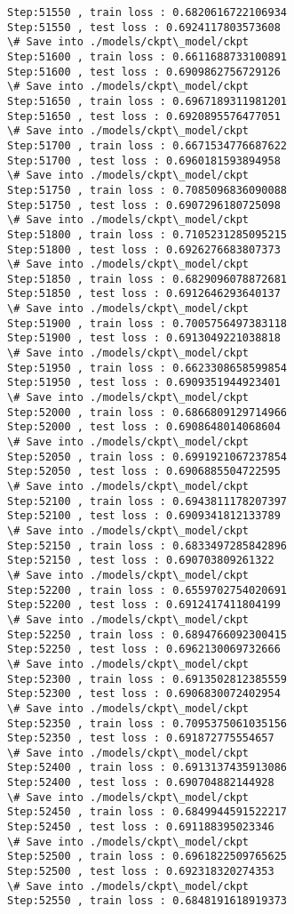 \documentclass[11pt]{article}
\begin{document}
\begin{Verbatim}[commandchars=\\\{\}]
Step:51550 , train loss : 0.6820616722106934
Step:51550 , test loss : 0.6924117803573608
\# Save into ./models/ckpt\_model/ckpt
Step:51600 , train loss : 0.6611688733100891
Step:51600 , test loss : 0.6909862756729126
\# Save into ./models/ckpt\_model/ckpt
Step:51650 , train loss : 0.6967189311981201
Step:51650 , test loss : 0.6920895576477051
\# Save into ./models/ckpt\_model/ckpt
Step:51700 , train loss : 0.6671534776687622
Step:51700 , test loss : 0.6960181593894958
\# Save into ./models/ckpt\_model/ckpt
Step:51750 , train loss : 0.7085096836090088
Step:51750 , test loss : 0.6907296180725098
\# Save into ./models/ckpt\_model/ckpt
Step:51800 , train loss : 0.7105231285095215
Step:51800 , test loss : 0.6926276683807373
\# Save into ./models/ckpt\_model/ckpt
Step:51850 , train loss : 0.6829096078872681
Step:51850 , test loss : 0.6912646293640137
\# Save into ./models/ckpt\_model/ckpt
Step:51900 , train loss : 0.7005756497383118
Step:51900 , test loss : 0.6913049221038818
\# Save into ./models/ckpt\_model/ckpt
Step:51950 , train loss : 0.6623308658599854
Step:51950 , test loss : 0.6909351944923401
\# Save into ./models/ckpt\_model/ckpt
Step:52000 , train loss : 0.6866809129714966
Step:52000 , test loss : 0.6908648014068604
\# Save into ./models/ckpt\_model/ckpt
Step:52050 , train loss : 0.6991921067237854
Step:52050 , test loss : 0.6906885504722595
\# Save into ./models/ckpt\_model/ckpt
Step:52100 , train loss : 0.6943811178207397
Step:52100 , test loss : 0.6909341812133789
\# Save into ./models/ckpt\_model/ckpt
Step:52150 , train loss : 0.6833497285842896
Step:52150 , test loss : 0.690703809261322
\# Save into ./models/ckpt\_model/ckpt
Step:52200 , train loss : 0.6559702754020691
Step:52200 , test loss : 0.6912417411804199
\# Save into ./models/ckpt\_model/ckpt
Step:52250 , train loss : 0.6894766092300415
Step:52250 , test loss : 0.6962130069732666
\# Save into ./models/ckpt\_model/ckpt
Step:52300 , train loss : 0.6913502812385559
Step:52300 , test loss : 0.6906830072402954
\# Save into ./models/ckpt\_model/ckpt
Step:52350 , train loss : 0.7095375061035156
Step:52350 , test loss : 0.691872775554657
\# Save into ./models/ckpt\_model/ckpt
Step:52400 , train loss : 0.6913137435913086
Step:52400 , test loss : 0.690704882144928
\# Save into ./models/ckpt\_model/ckpt
Step:52450 , train loss : 0.6849944591522217
Step:52450 , test loss : 0.691188395023346
\# Save into ./models/ckpt\_model/ckpt
Step:52500 , train loss : 0.6961822509765625
Step:52500 , test loss : 0.692318320274353
\# Save into ./models/ckpt\_model/ckpt
Step:52550 , train loss : 0.6848191618919373

\end{Verbatim}
\end{document}
